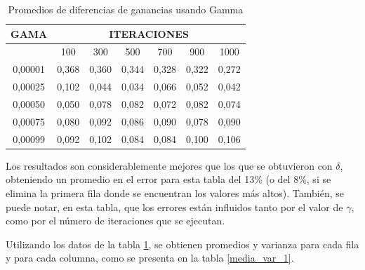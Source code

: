 \begin{table}[H]
\centering
\caption{Promedios de diferencias de ganancias usando Gamma}
\begin{tabular}{cllllll}
GAMA                 & \multicolumn{6}{c}{ITERACIONES}    \\ \hline
\multicolumn{1}{l}{} & \multicolumn{1}{c}{100} & \multicolumn{1}{c}{300} & \multicolumn{1}{c}{500} & \multicolumn{1}{c}{700} & \multicolumn{1}{c}{900} & \multicolumn{1}{c}{1000} \\ \hline
0,00001              & 0,368                   & 0,360                    & 0,344                   & 0,328                   & 0,322                   & 0,272                    \\
0,00025              & 0,102                   & 0,044                   & 0,034                   & 0,066                   & 0,052                   & 0,042                    \\
0,00050              & 0,050                    & 0,078                   & 0,082                   & 0,072                   & 0,082                   & 0,074                    \\
0,00075              & 0,080                    & 0,092                   & 0,086                   & 0,090                    & 0,078                   & 0,090                     \\
0,00099              & 0,092                   & 0,102                   & 0,084                   & 0,084                   & 0,100                     & 0,106         \\ \hline
\end{tabular}
\label{experimento1}
\end{table}

Los resultados son considerablemente mejores que los que se obtuvieron con $\delta$, obteniendo un promedio en el error para esta tabla del 13\% (o del 8\%, si se elimina la primera fila donde se encuentran los valores más altos). También, se puede notar, en esta tabla, que los errores están influidos tanto por el valor de $\gamma$, como por el número de iteraciones que se ejecutan.

Utilizando los datos de la tabla \ref{experimento1}, se obtienen promedios y varianza para cada fila y para cada columna, como se presenta en la tabla \ref{media_var_1}.

